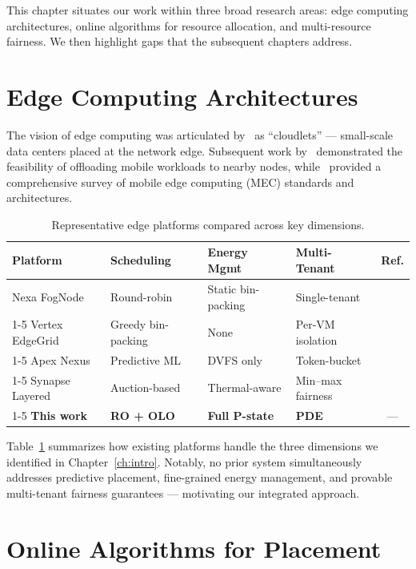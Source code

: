 \documentclass[12pt,oneside]{book}
\begin{document}
This chapter situates our work within three broad research areas: edge
computing architectures, online algorithms for resource allocation, and
multi-resource fairness. We then highlight gaps that the subsequent chapters
address.

\section{Edge Computing Architectures}

The vision of edge computing was articulated by~\citet{satyanarayanan2009case}
as ``cloudlets'' --- small-scale data centers placed at the network edge.
Subsequent work by~\citet{ha2014towards} demonstrated the feasibility of
offloading mobile workloads to nearby nodes, while~\citet{mao2017survey}
provided a comprehensive survey of mobile edge computing (MEC) standards and
architectures.

\begin{table}[htbp]
\centering
\singlespacing
\caption{Representative edge platforms compared across key dimensions.}
\label{tab:platforms}
\begin{tabularx}{0.92\textwidth}{p{2.6cm} X X X c}
\toprule
\textbf{Platform} & \textbf{Scheduling} & \textbf{Energy Mgmt} & \textbf{Multi-Tenant} & \textbf{Ref.} \\
\midrule
Nexa FogNode & Round-robin & Static bin-packing & Single-tenant & \cite{bonomi2012fog} \\
\cmidrule{1-5}
Vertex EdgeGrid & Greedy bin-packing & None & Per-VM isolation & \cite{yi2015survey} \\
\cmidrule{1-5}
Apex Nexus & Predictive ML & DVFS only & Token-bucket & \cite{shi2016edge} \\
\cmidrule{1-5}
Synapse Layered & Auction-based & Thermal-aware & Min--max fairness & \cite{mach2017mobile} \\
\cmidrule{1-5}
\textbf{This work} & \textbf{RO + OLO} & \textbf{Full P-state} & \textbf{PDE} & --- \\
\bottomrule
\end{tabularx}
\end{table}

Table~\ref{tab:platforms} summarizes how existing platforms handle the three
dimensions we identified in Chapter~\ref{ch:intro}. Notably, no prior system
simultaneously addresses predictive placement, fine-grained energy management,
and provable multi-tenant fairness guarantees --- motivating our integrated
approach.

\section{Online Algorithms for Placement}
\end{document}
